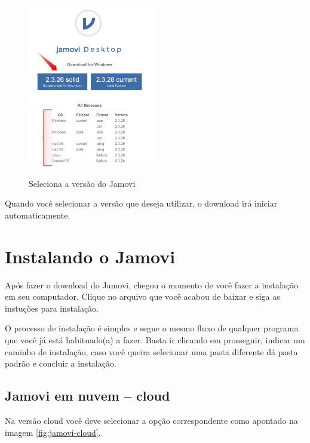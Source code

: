 \begin{figure}[H]
  \centering
  \caption{Seleciona a versão do Jamovi}
  \includegraphics[width=0.5\textwidth]{imagens/cap_1/seleciona_versao_jamovi.png}
  \label{fig:download_jamovi}
\end{figure}

Quando você selecionar a versão que deseja utilizar, o download irá iniciar automaticamente.

\section{Instalando o Jamovi}

Após fazer o download do Jamovi, chegou o momento de você fazer a instalação em seu computador. Clique no arquivo que você acabou de baixar e siga as instuções para instalação.

O processo de instalação é simples e segue o mesmo fluxo de qualquer programa que você já está habituado(a) a fazer. Basta ir clicando em prosseguir, indicar um caminho de instalação, caso você queira selecionar uma pasta diferente dá pasta padrão e concluir a instalação.

\subsection{Jamovi em nuvem – cloud}

Na versão cloud você deve selecionar a opção correspondente como apontado na imagem \ref{fig:jamovi-cloud}.

